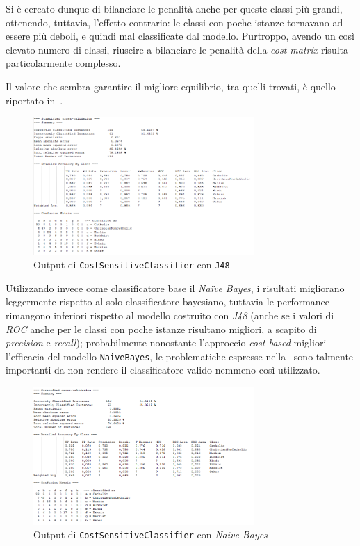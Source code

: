 \documentclass[a4paper,11pt,twoside,notitlepage,final]{scrartcl}
\begin{document}
Si è cercato dunque di bilanciare le penalità anche per queste classi più grandi, ottenendo, tuttavia, l'effetto contrario: le classi con poche istanze tornavano ad essere più deboli, e quindi mal classificate dal modello.
Purtroppo, avendo un così elevato numero di classi, riuscire a bilanciare le penalità della \emph{cost matrix} risulta particolarmente complesso.

Il valore che sembra garantire il migliore equilibrio, tra quelli trovati, è quello riportato in~.

\begin{figure}[H]
  \centering
  \includegraphics[width=0.75\textwidth]{fig/MultiJ48.PNG}%
  \caption{Output di \texttt{CostSensitiveClassifier} con \texttt{J48}}%
  \label{fig:cost:j48}
\end{figure}

Utilizzando invece come classificatore base il \emph{Naïve Bayes}, i risultati migliorano leggermente rispetto al solo classificatore bayesiano, tuttavia le performance rimangono inferiori rispetto al modello costruito con \emph{J48} (anche se i valori di \emph{ROC} anche per le classi con poche istanze risultano migliori, a scapito di \emph{precision} e \emph{recall});
probabilmente nonostante l'approccio \emph{cost-based} migliori l'efficacia del modello \texttt{NaiveBayes}, le problematiche espresse nella~ sono talmente importanti da non rendere il classificatore valido nemmeno così utilizzato.

\begin{figure}[H]
  \centering
  \includegraphics[width=0.75\textwidth]{fig/MultiBayes.PNG}%
  \caption{Output di \texttt{CostSensitiveClassifier} con \emph{Naïve Bayes}}%
  \label{fig:cost:j48}
\end{figure}
\end{document}
